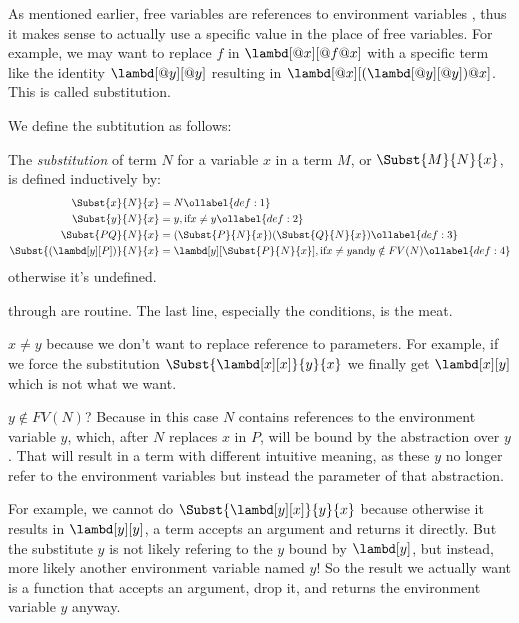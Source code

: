 \documentclass[../../../include/open-logic-section]{subfiles}
\begin{document}

As mentioned earlier, free variables are references to environment variables
, thus it makes sense to actually use a specific value in the place of free
variables. For example, we may want to replace $f$ in
$\lambd[@x][@f @x]$ with a specific term like the identity
$\lambd[@y][@y]$ resulting in $\lambd[@x][(\lambd[@y][@y]) @x]$. This is
called substitution.

We define the subtitution as follows:

\begin{defn}[Substitution] 
  The \emph{substitution} of term $N$ for a variable $x$ in a term $M$, or
  $\Subst{M}{N}{x}$,  is defined inductively by:
  \begin{align}
    \Subst{x}{N}{x}       &= N \ollabel{def:1} \\
    \Subst{y}{N}{x}       &= y, \text{if} x \neq y \ollabel{def:2} \\
    \Subst{PQ}{N}{x} &= (\Subst{P}{N}{x}) (\Subst{Q}{N}{x}) \ollabel{def:3} \\
    \Subst{(\lambd[y][P])}{N}{x}  &= \lambd[y][\Subst{P}{N}{x}], \text{if} x \neq y
                                        \text{and} y \notin FV(N) \ollabel{def:4}
  \end{align}
  otherwise it's undefined.
\end{defn}

 through  are routine. The last line,
especially the conditions, is the meat. 

$x \neq y$ because we don't want to replace reference to parameters.
For example, if we force the substitution
$\Subst{\lambd[x][x]}{y}{x}$ we finally get $\lambd[x][y]$ which
is not what we want.

$y \notin FV(N)$? Because in this case $N$ contains references to the environment variable $y$, which,
after $N$ replaces $x$ in $P$, will be bound by the abstraction over
$y$. That will result in a term with different intuitive meaning, as
these $y$ no longer refer to the environment variables but instead
the parameter of that abstraction. 

For example, we cannot do $\Subst{\lambd[y][x]}{y}{x}$ because
otherwise it results in $\lambd[y][y]$, a term accepts an argument and
returns it directly. But the substitute $y$ is not likely refering
to the $y$ bound by $\lambd[y]$, but instead, more likely another
environment variable named $y$! So the result we actually want is a
function that accepts an argument, drop it, and returns the
environment variable $y$ anyway.
\end{document}

